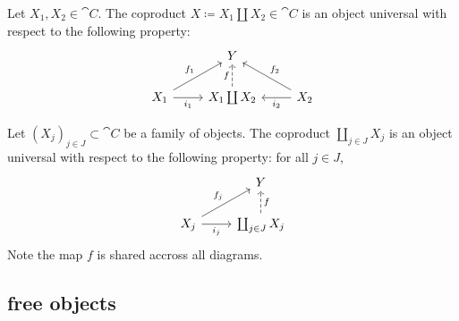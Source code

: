 \documentclass[12pt]{article}
\begin{document}
\begin{definition}
	Let $X_1,X_2\in\cat{C}$. The coproduct $X\coloneqq X_1\coprod X_2 \in \cat{C}$ is an object universal with respect to the following property: 
	\begin{equation*}
\begin{tikzcd}
                                        & Y                                     &                                         \\
X_1 \arrow[r, "i_1"'] \arrow[ru, "f_1"] & X_1\coprod X_2 \arrow[u, "f", dashed] & X_2 \arrow[l, "i_2"] \arrow[lu, "f_2"']
\end{tikzcd}
	\end{equation*}
\end{definition}

\begin{definition}
	Let $(X_j)_{j\in J}\subset \cat{C}$ be a family of objects. The coproduct $\coprod_{j\in J} X_j$ is an object universal with respect to the following property: for all $j\in J$,
	\begin{equation*}
\begin{tikzcd}
                                        & Y                                           \\
X_j \arrow[r, "i_j"'] \arrow[ru, "f_j"] & \coprod_{j\in J}X_j \arrow[u, "f"', dashed]
\end{tikzcd}
	\end{equation*}
	Note the map $f$ is shared accross all diagrams.
\end{definition}


\subsection{free objects} %
\end{document}
